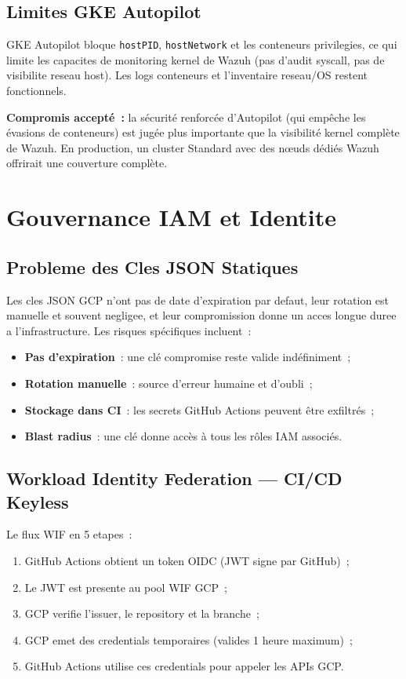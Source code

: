 \subsection{Limites GKE Autopilot}
GKE Autopilot bloque \texttt{hostPID}, \texttt{hostNetwork} et les conteneurs privilegies,
ce qui limite les capacites de monitoring kernel de Wazuh (pas d'audit syscall, pas de visibilite
reseau host). Les logs conteneurs et l'inventaire reseau/OS restent fonctionnels.

\textbf{Compromis accepté~:} la sécurité renforcée d'Autopilot (qui empêche les évasions de
conteneurs) est jugée plus importante que la visibilité kernel complète de Wazuh. En
production, un cluster Standard avec des nœuds dédiés Wazuh offrirait une couverture complète.
\section{Gouvernance IAM et Identite}

\subsection{Probleme des Cles JSON Statiques}
Les cles JSON GCP n'ont pas de date d'expiration par defaut, leur rotation est manuelle
et souvent negligee, et leur compromission donne un acces longue duree a l'infrastructure.
Les risques spécifiques incluent~:
\begin{itemize}
  \item \textbf{Pas d'expiration}~: une clé compromise reste valide indéfiniment~;
  \item \textbf{Rotation manuelle}~: source d'erreur humaine et d'oubli~;
  \item \textbf{Stockage dans CI}~: les secrets GitHub Actions peuvent être exfiltrés~;
  \item \textbf{Blast radius}~: une clé donne accès à tous les rôles IAM associés.
\end{itemize}

\subsection{Workload Identity Federation --- CI/CD Keyless}
Le flux WIF en 5 etapes~:
\begin{enumerate}
  \item GitHub Actions obtient un token OIDC (JWT signe par GitHub)~;
  \item Le JWT est presente au pool WIF GCP~;
  \item GCP verifie l'issuer, le repository et la branche~;
  \item GCP emet des credentials temporaires (valides 1 heure maximum)~;
  \item GitHub Actions utilise ces credentials pour appeler les APIs GCP.
\end{enumerate}

